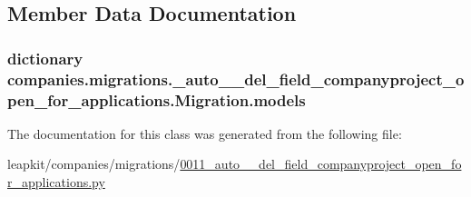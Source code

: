 \subsection{Member Data Documentation}
\hypertarget{classcompanies_1_1migrations_1_10011__auto____del__field__companyproject__open__for__applications_1_1_migration_addfc790b7ce391c2ba297301e370d698}{
\subsubsection[{models}]{\setlength{\rightskip}{0pt plus 5cm}dictionary companies.\-migrations.\-\_\-auto\-\_\-\-\_\-del\-\_\-field\-\_\-companyproject\-\_\-open\-\_\-for\-\_\-applications.\-Migration.\-models\hspace{0.3cm}{\ttfamily [static]}}}\label{classcompanies_1_1migrations_1_10011__auto____del__field__companyproject__open__for__applications_1_1_migration_addfc790b7ce391c2ba297301e370d698}


The documentation for this class was generated from the following file\-:\begin{DoxyCompactItemize}
\item 
leapkit/companies/migrations/\hyperlink{0011__auto____del__field__companyproject__open__for__applications_8py}{0011\-\_\-auto\-\_\-\-\_\-del\-\_\-field\-\_\-companyproject\-\_\-open\-\_\-for\-\_\-applications.\-py}\end{DoxyCompactItemize}
